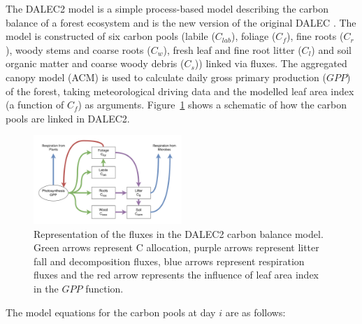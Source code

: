 The DALEC2 model is a simple process-based model describing the carbon balance of a forest ecosystem \citep{Bloom2015} and is the new version of the original DALEC \citep{williams2005improved}. The model is constructed of six carbon pools (labile ($C_{lab}$), foliage ($C_f$), fine roots ($C_r$), woody stems and coarse roots ($C_w$), fresh leaf and fine root litter ($C_l$) and soil organic matter and coarse woody debris ($C_s$)) linked via fluxes. The aggregated canopy model (ACM) \citep{williams1997predicting} is used to calculate daily gross primary production ($GPP$) of the forest, taking meteorological driving data and the modelled leaf area index (a function of $C_f$) as arguments. Figure~\ref{chap6:fig:DALEC_mod} shows a schematic of how the carbon pools are linked in DALEC2.   

\begin{figure}[ht]
    \centering
    \includegraphics[width=0.5\textwidth]{chapter/chapter6/dalec2diag.pdf}
    \caption{Representation of the fluxes in the DALEC2 carbon balance model. Green arrows represent C allocation, purple arrows represent litter fall and decomposition fluxes, blue arrows represent respiration fluxes and the red arrow represents the influence of leaf area index in the $GPP$ function.} \label{chap6:fig:DALEC_mod}
\end{figure}

The model equations for the carbon pools at day $i$ are as follows:

